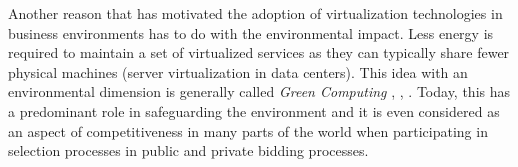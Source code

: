 	
	
	Another reason that has motivated the adoption of virtualization technologies in business environments has to do with the environmental impact. 
	Less energy is required to maintain a set of virtualized services as they can typically share fewer physical machines (server virtualization in data centers). 
	This idea with an environmental dimension is generally called \textit{Green Computing} \cite {Thathera2015}, \cite{Ranjith2017}, \cite {Jing2011}. 
	Today, this has a predominant role in safeguarding the environment and it is even considered as an aspect of competitiveness in many parts of the world when participating in selection processes in public and private bidding processes.
	
	
	 
